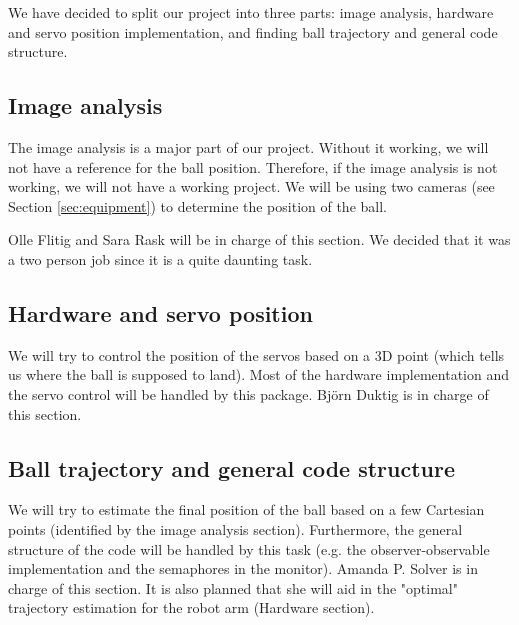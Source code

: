 We have decided to split our project into three parts: image analysis, hardware and servo position implementation, and finding ball trajectory and general code structure.
	\subsection{Image analysis}
        The image analysis is a major part of our project. Without it working, we will not have a reference for the ball position. Therefore, if the image analysis is not working, we will not have a working project. We will be using two cameras (see Section \ref{sec:equipment}) to determine the position of the ball. 
    
        Olle Flitig and Sara Rask will be in charge of this section. We decided that it was a two person job since it is a quite daunting task.
    
    \subsection{Hardware and servo position}
        We will try to control the position of the servos based on a 3D point (which tells us  where the ball is supposed to land). Most of the hardware implementation and the servo control will be handled by this package. Björn Duktig is in charge of this section.
    
    \subsection{Ball trajectory and general code structure}
        We will try to estimate the final position of the ball based on a few Cartesian points (identified by the image analysis section). Furthermore, the general structure of the code will be handled by this task (e.g. the observer-observable implementation and the semaphores in the monitor). Amanda P. Solver is in charge of this section. It is also planned that she will aid in the "optimal" trajectory estimation for the robot arm (Hardware section).
